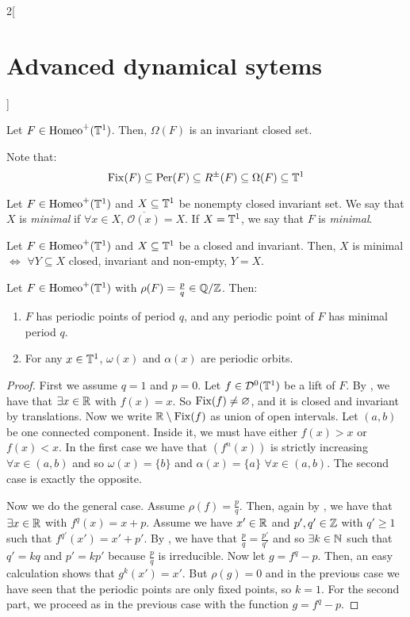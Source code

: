 \documentclass[../../../main_math.tex]{subfiles}
\begin{document}
\begin{multicols}{2}[\section{Advanced dynamical sytems}]
\begin{proposition}
    Let $F\in \mathrm{Homeo}^+(\mathbb{T}^1)$. Then, $\Omega(F)$ is an invariant closed set.
  \end{proposition}
  \begin{remark}
    Note that:
    $$
      \mathrm{Fix}(F)\subseteq \operatorname{Per}(F)\subseteq R^\pm(F)\subseteq \Omega(F)\subseteq \mathbb{T}^1
    $$
  \end{remark}
  \begin{definition}
    Let $F\in \mathrm{Homeo}^+(\mathbb{T}^1)$ and $X\subseteq \mathbb{T}^1$ be nonempty closed invariant set. We say that $X$ is \emph{minimal} if $\forall x\in X$, $\overline{\mathcal{O}(x)}=X$. If $X=\mathbb{T}^1$, we say that $F$ is \emph{minimal}.
  \end{definition}
  \begin{proposition}
    Let $F\in \mathrm{Homeo}^+(\mathbb{T}^1)$ and $X\subseteq \mathbb{T}^1$ be a closed and invariant. Then, $X$ is minimal $\iff$ $\forall Y\subseteq X$ closed, invariant and non-empty, $Y=X$.
  \end{proposition}
  \begin{theorem}
    Let $F\in \mathrm{Homeo}^+(\mathbb{T}^1)$ with $\rho(F)=\frac{p}{q}\in \quot{\QQ}{\ZZ}$. Then:
    \begin{enumerate}
      \item $F$ has periodic points of period $q$, and any periodic point of $F$ has minimal period $q$.
      \item For any $x\in \mathbb{T}^1$, $\omega(x)$ and $\alpha(x)$ are periodic orbits.
    \end{enumerate}
  \end{theorem}
  \begin{proof}
    First we assume $q=1$ and $p=0$. Let $f\in \mathcal{D}^0(\mathbb{T}^1)$ be a lift of $F$. By , we have that $\exists x\in \mathbb{R}$ with $f(x)=x$. So $\mathrm{Fix}(f)\ne \varnothing$, and it is closed and invariant by translations. Now we write $\mathbb{R}\setminus\mathrm{Fix}(f)$ as union of open intervals. Let $(a,b)$ be one connected component. Inside it, we must have either $f(x)>x$ or $f(x)<x$. In the first case we have that $(f^n(x))$ is strictly increasing $\forall x\in (a,b)$ and so $\omega(x)=\{b\}$ and $\alpha(x)=\{a\}$ $\forall x\in(a,b)$. The second case is exactly the opposite.

    Now we do the general case. Assume $\rho(f)=\frac{p}{q}$. Then, again by , we have that $\exists x\in \mathbb{R}$ with $f^q(x)=x+p$. Assume we have $x'\in\mathbb{R}$ and $p',q'\in\mathbb{Z}$ with $q'\geq 1$ such that $f^{q'}(x')=x'+p'$. By , we have that $\frac{p}{q}=\frac{p'}{q'}$ and so $\exists k\in\mathbb{N}$ such that $q'=kq$ and $p'=kp'$ because $\frac{p}{q}$ is irreducible. Now let $g=f^q-p$. Then, an easy calculation shows that $g^k(x')=x'$. But $\rho(g)=0$ and in the previous case we have seen that the periodic points are only fixed points, so $k=1$. For the second part, we proceed as in the previous case with the function $g=f^q-p$.
  \end{proof}

\end{multicols}
\end{document}
